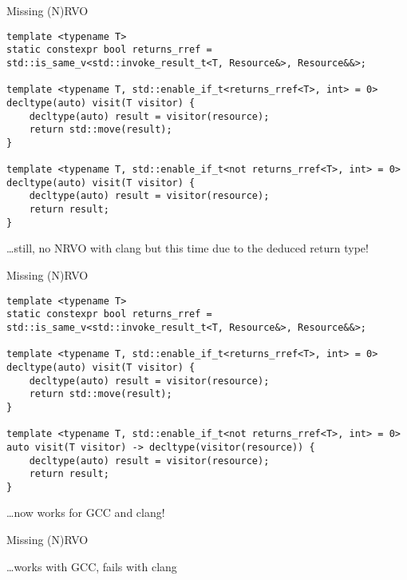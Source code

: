 \documentclass[compress,aspectratio=1610]{beamer}
\newcommand{\inputcpplisting}[1]{}
\begin{document}
\begin{frame}[fragile]{Missing (N)RVO}
    \begin{lstlisting}
template <typename T>
static constexpr bool returns_rref = std::is_same_v<std::invoke_result_t<T, Resource&>, Resource&&>;

template <typename T, std::enable_if_t<returns_rref<T>, int> = 0>
decltype(auto) visit(T visitor) {
    decltype(auto) result = visitor(resource);
    return std::move(result);
}

template <typename T, std::enable_if_t<not returns_rref<T>, int> = 0>
decltype(auto) visit(T visitor) {
    decltype(auto) result = visitor(resource);
    return result;
}
    \end{lstlisting}

    \hfill \ldots still, no NRVO with clang but this time due to the deduced return type!
\end{frame}

\begin{frame}[fragile]{Missing (N)RVO}
    \begin{lstlisting}
template <typename T>
static constexpr bool returns_rref = std::is_same_v<std::invoke_result_t<T, Resource&>, Resource&&>;

template <typename T, std::enable_if_t<returns_rref<T>, int> = 0>
decltype(auto) visit(T visitor) {
    decltype(auto) result = visitor(resource);
    return std::move(result);
}

template <typename T, std::enable_if_t<not returns_rref<T>, int> = 0>
auto visit(T visitor) -> decltype(visitor(resource)) {
    decltype(auto) result = visitor(resource);
    return result;
}
    \end{lstlisting}

    \hfill \ldots now works for GCC and clang!
\end{frame}

\begin{frame}
    \inputcpplisting{snippet17}
\end{frame}

\begin{frame}
    \scalebox{3.}{More things that don't work}
\end{frame}

\begin{frame}[fragile]{Missing (N)RVO}
    \inputcpplisting{snippet19a}

    \hfill \ldots works with GCC, fails with clang
\end{frame}
\end{document}

